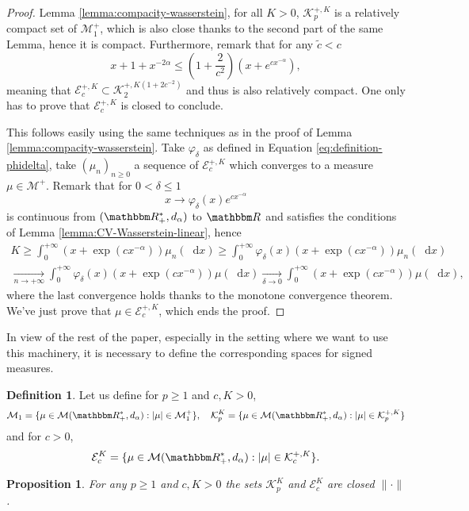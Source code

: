 \documentclass[a4paper,11pt, reqno]{amsart}
\newcommand{\cE}{\mathcal{E}}	\newcommand{\EE}{\mathbbm{E}}
\newcommand{\cK}{\mathcal{K}}	\newcommand{\KK}{\mathbbm{K}}
\newcommand{\cM}{\mathcal{M}}	\newcommand{\MM}{\mathbbm{M}}
\newcommand{\dd}{\mathop{}\!\mathrm{d}}
\newcommand{\1}{\mathbbm{1}}
\theoremstyle{plain}
\newtheorem{proposition}[theorem]{Proposition}
\theoremstyle{definition}
\newtheorem{definition}[theorem]{Definition}
\begin{document}
\begin{proof}
Lemma \ref{lemma:compacity-wasserstein}, for all $K >
0$, $\cK^{+, K}_p$ is a relatively compact set of $\cM_1^+$, which is also close thanks to the second part of the same Lemma, hence it is compact. Furthermore, remark that for any $\tilde{c}<c$
\[x+1+x^{-2\alpha} \le \left(1+\frac{2}{c^2}\right)\left(x+ e^{c x^{-\alpha}}\right),\]
meaning that $\cE^{+,K}_c \subset \cK^{+,K(1+2c^{-2})}_2$ and thus is also relatively compact. 
One only has to prove that $\cE^{+,K}_c$ is closed to conclude.

This follows easily using the same techniques as in the proof of Lemma \ref{lemma:compacity-wasserstein}. Take $\varphi_{\delta}$ as defined in Equation \ref{eq:definition-phidelta}, take $(\mu_n)_{n\ge 0}$ a sequence of $\cE^{+,K}_c$ which converges to a measure $\mu\in \cM^+$. Remark that for $0<\delta\le 1$
\[x \to \varphi_\delta(x) e^{cx^{-\alpha}} \] 
is continuous from $(\RR_+^*,d_\alpha)$ to $\RR$ and satisfies the conditions of Lemma \ref{lemma:CV-Wasserstein-linear}, hence 
\begin{multline*}
    K\ge \int_0^{+\infty} (x+\exp(cx^{-\alpha}))  \mu_n(\dd x) \ge \int_0^{+\infty} \varphi_{\delta}(x)(x+\exp(cx^{-\alpha}))  \mu_n(\dd x) \\ \underset{n \to +\infty}{\to} \int_0^{+\infty} \varphi_{\delta}(x)(x+\exp(cx^{-\alpha}))  \mu(\dd x) \underset{\delta \to 0}{\to} \int_0^{+\infty} (x+\exp(cx^{-\alpha}))  \mu(\dd x),
\end{multline*}
where the last convergence holds thanks to the monotone convergence theorem.
We've just prove that $\mu \in \cE^{+,K}_c$, which ends the proof.
\end{proof}

In view of the rest of the paper, especially in the setting where we want to use this machinery, it is necessary to define the corresponding spaces for signed measures. 

\begin{definition}
  Let us define for $p \ge 1$ and $c,K > 0$,
  \[ \cM_1 = \{ \mu \in \cM (\RR_+^{\ast}, d_{\alpha})
     : | \mu | \in \cM_1^+ \}, \quad \cK_p^K = \{ \mu \in
     \cM (\RR_+^{\ast}, d_{\alpha}) : | \mu | \in
     \cK_p^{+, K} \}  \]
  and for $c>0$,
  \[ \cE_c^{K} = \{ \mu \in \cM (\RR_+^{\ast},
     d_{\alpha}) : | \mu | \in \cK_c^{+,K} \}. \]
\end{definition}

\begin{proposition}
  For any $p \ge 1$ and $c,K > 0$ the sets $\cK_p^K$ and $\cE^{K}_c$ are closed
  $\| \cdot \|$.
\end{proposition}
\end{document}

